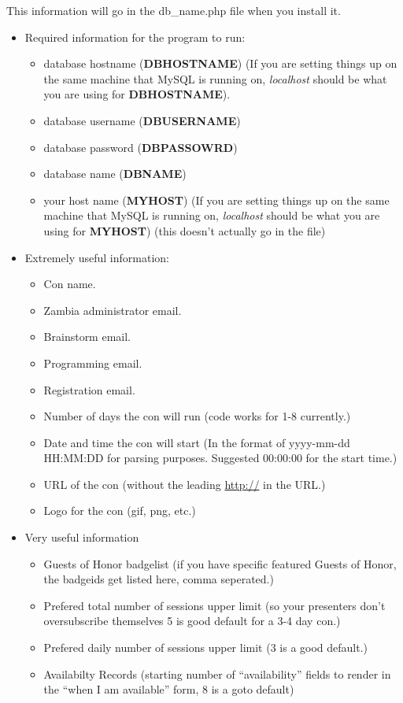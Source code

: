 \documentclass[tablesignature]{scrartcl}
\begin{document}
    This information will go in the db\_{}name.php file when you install it.
\begin{itemize}

\item Required information for the program to run:
\label{sec-1_2_3_1}%
\begin{itemize}
\item database hostname (\textbf{DBHOSTNAME}) (If you are setting things up on
     the same machine that MySQL is running on, \emph{localhost} should be
     what you are using for \textbf{DBHOSTNAME}).
\item database username (\textbf{DBUSERNAME})
\item database password (\textbf{DBPASSOWRD})
\item database name (\textbf{DBNAME})
\item your host name (\textbf{MYHOST}) (If you are setting things up on the same
     machine that MySQL is running on, \emph{localhost} should be what you
     are using for \textbf{MYHOST}) (this doesn't actually go in the file)
\end{itemize}


\item Extremely useful information:
\label{sec-1_2_3_2}%
\begin{itemize}
\item Con name.
\item Zambia administrator email.
\item Brainstorm email.
\item Programming email.
\item Registration email.
\item Number of days the con will run (code works for 1-8 currently.)
\item Date and time the con will start (In the format of yyyy-mm-dd HH:MM:DD for parsing purposes.  Suggested 00:00:00 for the start time.)
\item URL of the con (without the leading \href{http://}{http://} in the URL.)
\item Logo for the con (gif, png, etc.)
\end{itemize}


\item Very useful information
\label{sec-1_2_3_3}%
\begin{itemize}
\item Guests of Honor badgelist (if you have specific featured Guests of Honor, the badgeids get listed here, comma seperated.)
\item Prefered total number of sessions upper limit (so your presenters don't oversubscribe themselves 5 is good default for a 3-4 day con.)
\item Prefered daily number of sessions upper limit (3 is a good default.)
\item Availabilty Records (starting number of ``availability'' fields to render in the ``when I am available'' form, 8 is a goto default)
\end{itemize}



\end{itemize}
\end{document}
